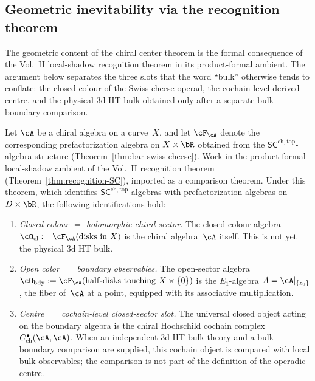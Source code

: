 \subsection{Geometric inevitability via the recognition
theorem}
\label{subsec:center-geometric}

The geometric content of the chiral center theorem is the formal
consequence of the Vol.~II local-shadow recognition theorem in its
product-formal ambient. The argument below separates the three slots
that the word ``bulk'' otherwise tends to conflate: the closed colour
of the Swiss-cheese operad, the cochain-level derived centre, and the
physical $3$d HT bulk obtained only after a separate bulk-boundary
comparison.

\begin{theorem}
\label{thm:center-geometric-inevitability}
Let $\cA$ be a chiral algebra on a curve~$X$, and let
$\cF_\cA$ denote the corresponding prefactorization algebra on
$X \times \bR$ obtained from the
$\mathsf{SC}^{\mathrm{ch,top}}$-algebra structure
\textup{(}Theorem~\textup{\ref{thm:bar-swiss-cheese})}.
Work in the product-formal local-shadow ambient of the Vol.~II
recognition theorem
\textup{(}Theorem~\textup{\ref{thm:recognition-SC}}\textup{)}, imported
as a comparison theorem. Under this theorem, which identifies
$\mathsf{SC}^{\mathrm{ch,top}}$-algebras with prefactorization
algebras on $D \times \bR$, the following identifications hold:
\begin{enumerate}[label=\textup{(\roman*)}]
\item \emph{Closed colour $=$ holomorphic chiral sector.}
 The closed-colour algebra
 $\cO_{\mathrm{cl}} := \cF_\cA(\mathrm{disks\ in\ } X)$
 is the chiral algebra~$\cA$ itself. This is not yet the
 physical $3$d HT bulk.
\item \emph{Open color $=$ boundary observables.} The open-sector
 algebra
 $\cO_{\mathrm{bdy}} := \cF_\cA(\mathrm{half\text{-}disks\ touching\ }
 X \times \{0\})$
 is the $E_1$-algebra $A = \cA|_{\{z_0\}}$, the fiber of~$\cA$
 at a point, equipped with its associative multiplication.
\item \emph{Centre $=$ cochain-level closed-sector slot.} The
 universal closed object acting on the boundary algebra is the
 chiral Hochschild cochain complex
 $C^{\bullet}_{\mathrm{ch}}(\cA, \cA)$. When an independent
 $3$d HT bulk theory and a bulk-boundary comparison are supplied,
 this cochain object is compared with local bulk observables; the
 comparison is not part of the definition of the operadic centre.
\end{enumerate}
\end{theorem}

